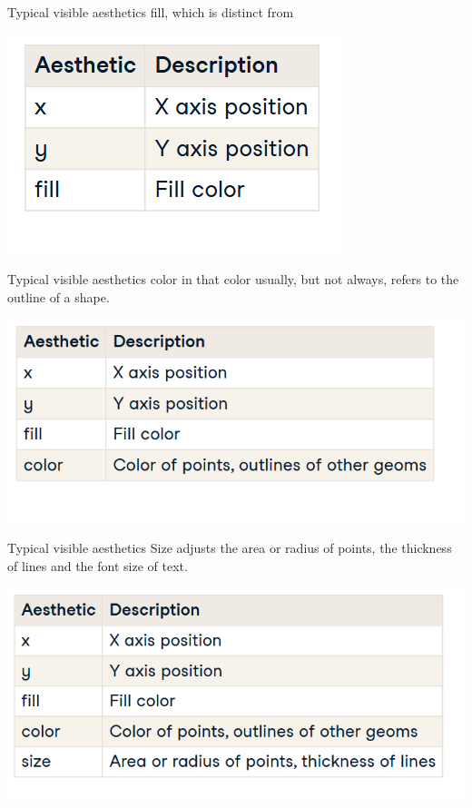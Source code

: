 \documentclass[
  ignorenonframetext,
]{beamer}
\begin{document}
\begin{frame}{Typical visible aesthetics}
\label{typical-visible-aesthetics-1}
fill, which is distinct from

\includegraphics{../images/im140.png}
\end{frame}

\begin{frame}{Typical visible aesthetics}
\label{typical-visible-aesthetics-2}
color in that color usually, but not always, refers to the outline of a
shape.

\includegraphics{../images/im141.png}
\end{frame}

\begin{frame}{Typical visible aesthetics}
\label{typical-visible-aesthetics-3}
Size adjusts the area or radius of points, the thickness of lines and
the font size of text.

\includegraphics{../images/im142.png}
\end{frame}
\end{document}
